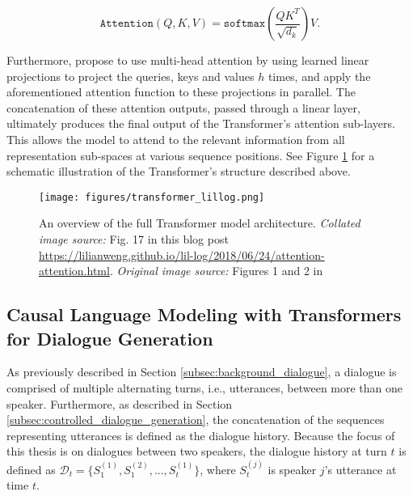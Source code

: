 \begin{equation}
    \texttt{Attention}(Q, K, V) = \texttt{softmax} \left( \frac{QK^T}{\sqrt{d_k}}\right) V.
\end{equation}

Furthermore, \cite{vaswani2017attention} propose to use multi-head attention by using learned linear projections to project the queries, keys and values $h$ times, and apply the aforementioned attention function to these projections in parallel. The concatenation of these attention outputs, passed through a linear layer, ultimately produces the final output of the Transformer's attention sub-layers. This allows the model to attend to the relevant information from all representation sub-spaces at various sequence positions. See Figure \ref{fig:transformer_architecture} for a schematic illustration of the Transformer's structure described above.


\begin{figure}[H]
    \centering
    \texttt{[image: figures/transformer\_lillog.png]}
    \caption{An overview of the full Transformer model architecture. \textit{Collated image source:} Fig. 17 in this blog post \url{https://lilianweng.github.io/lil-log/2018/06/24/attention-attention.html}. \textit{Original image source:} Figures 1 and 2 in \cite{vaswani2017attention}}
    \label{fig:transformer_architecture}
\end{figure}

\subsection{Causal Language Modeling with Transformers for Dialogue Generation}
\label{subsec:causal_lm_with_transformers_dialogue_gen}
As previously described in Section \ref{subsec:background_dialogue}, 
a dialogue is comprised of multiple alternating turns, i.e., utterances, between more than one speaker. Furthermore, as described in Section \ref{subsec:controlled_dialogue_generation}, the concatenation of the sequences representing utterances is defined as the dialogue history. Because the focus of this thesis is on dialogues between two speakers, the dialogue history at turn $t$ is defined as $\mathcal{D}_t = \{S^{(1)}_1, S^{(2)}_1, ..., S^{(1)}_t\}$, where $S^{(j)}_t$ is speaker $j$'s utterance at time $t$. 


